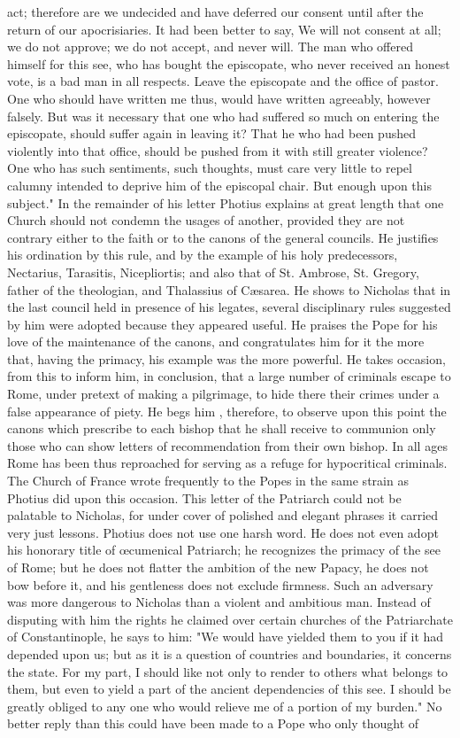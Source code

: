 act; therefore are we undecided and have deferred our consent until after the return of our apocrisiaries. It had been better to say, We will not consent at all; we do not approve; we do not accept, and never will. The man who offered himself for this see, who has bought the episcopate, who never received an honest vote, is a bad man in all respects. Leave the episcopate and the office of pastor. One who should have written me thus, would have written agreeably, however falsely. But was it necessary that one who had suffered so much on entering the episcopate, should suffer again in leaving it? That he who had been pushed violently into that office, should be pushed from it with still greater violence? One who has such sentiments, such thoughts, must care very little to repel calumny intended to deprive him of the episcopal chair. But enough upon this subject." In the remainder of his letter Photius explains at great length that one Church should not condemn the usages of another, provided they are not contrary either to the faith or to the canons of the general councils. He justifies his ordination by this rule, and by the example of his holy predecessors, Nectarius, Tarasitis, Nicepliortis; and also that of St. Ambrose, St. Gregory, father of the theologian, and Thalassius of Cæsarea. He shows to Nicholas that in the last council held in presence of his legates, several disciplinary rules suggested by him were adopted because they appeared useful. He praises the Pope for his love of the maintenance of the canons, and congratulates him for it the more that, having the primacy, his example was the more powerful. He takes occasion, from this to inform him, in conclusion, that a large number of criminals escape to Rome, under pretext of making a pilgrimage, to hide there their crimes under a false appearance of piety. He begs him , therefore, to observe upon this point the canons which prescribe to each bishop that he shall receive to communion only those who can show letters of recommendation from their own bishop. In all ages Rome has been thus reproached for serving as a refuge for hypocritical criminals. The Church of France wrote frequently to the Popes in the same strain as Photius did upon this occasion. This letter of the Patriarch could not be palatable to Nicholas, for under cover of polished and elegant phrases it carried very just lessons. Photius does not use one harsh word. He does not even adopt his honorary title of œcumenical Patriarch; he recognizes the primacy of the see of Rome; but he does not flatter the ambition of the new Papacy, he does not bow before it, and his gentleness does not exclude firmness. Such an adversary was more dangerous to Nicholas than a violent and ambitious man. Instead of disputing with him the rights he claimed over certain churches of the Patriarchate of Constantinople, he says to him: "We would have yielded them to you if it had depended upon us; but as it is a question of countries and boundaries, it concerns the state. For my part, I should like not only to render to others what belongs to them, but even to yield a part of the ancient dependencies of this see. I should be greatly obliged to any one who would relieve me of a portion of my burden." No better reply than this could have been made to a Pope who only thought of 